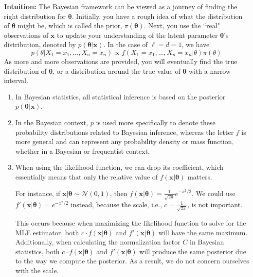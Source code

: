 \documentclass[13pt]{article}
\theoremstyle{definition}
\theoremstyle{remark}
\newenvironment{remark}
  {\pushQED{\qed}\renewcommand{\qedsymbol}{$\triangle$}\remarkx}
  {\popQED\endremarkx}
\begin{document}
{\color{C6}\textbf{Intuition:}} The Bayesian framework can be viewed as a journey of finding the right distribution for $\bm{\theta}$. Initially, you have a rough idea of what the distribution of $\bm{\theta}$ might be, which is called the prior, $\pi(\bm{\theta})$. Next, you use the ``real" observations of $\bm{x}$ to update your understanding of the latent parameter $\bm{\theta}$'s distribution, denoted by $p(\bm{\theta}|\bm{x})$. In the case of $\ell=d=1$, we have
\[
p\left(\theta | X_1=x_1, \ldots, X_n=x_n\right) \propto f\left(X_1=x_1, \ldots, X_n=x_n |\theta\right) \pi(\theta)
\]
As more and more observations are provided, you will eventually find the true distribution of $\bm{\theta}$, or a distribution around the true value of $\bm{\theta}$ with a narrow interval.
\begin{remark}\hfill
\begin{enumerate}
    \item  In Bayesian statistics, all statistical inference is based on the posterior $p(\bm{\theta}|\bm{x})$.
    \item In the Bayesian context, $p$ is used more specifically to denote these probability distributions related to Bayesian inference, whereas the letter $f$ is more general and can represent any probability density or mass function, whether in a Bayesian or frequentist context.
    \item When using the likelihood function, we can drop its coefficient, which essentially means that only the relative value of $f(\bm{x} | \bm{\theta})$ matters.

For instance, if $\bm{x} | \bm{\theta} \sim \mathcal{N}(0,1)$, then $f(\bm{x} | \bm{\theta}) = \frac{1}{\sqrt{2 \pi}} e^{-x^2 / 2}$. We could use $f'(\bm{x} | \bm{\theta}) = e^{-x^2 / 2}$ instead, because the scale, i.e., $c = \frac{1}{\sqrt{2 \pi}}$, is not important.

This occurs because when maximizing the likelihood function to solve for the MLE estimator, both $c \cdot f(\bm{x} | \bm{\theta})$ and $f'(\bm{x} | \bm{\theta})$ will have the same maximum. Additionally, when calculating the normalization factor $C$ in Bayesian statistics, both $c \cdot f(\bm{x} | \bm{\theta})$ and $f'(\bm{x} | \bm{\theta})$ will produce the same posterior due to the way we compute the posterior. As a result, we do not concern ourselves with the scale.
\end{enumerate}
\end{remark}
\end{document}
